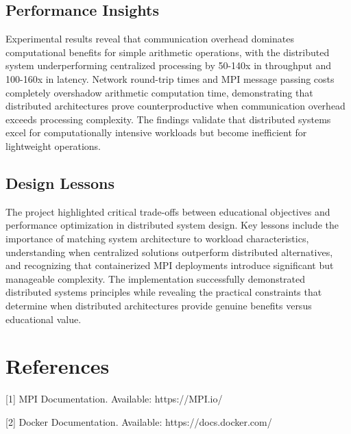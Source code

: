 \documentclass{article}
\begin{document}
\subsection{Performance Insights}
Experimental results reveal that communication overhead dominates computational benefits for simple arithmetic operations, with the distributed system underperforming centralized processing by 50-140x in throughput and 100-160x in latency. Network round-trip times and MPI message passing costs completely overshadow arithmetic computation time, demonstrating that distributed architectures prove counterproductive when communication overhead exceeds processing complexity. The findings validate that distributed systems excel for computationally intensive workloads but become inefficient for lightweight operations.

\subsection{Design Lessons}
The project highlighted critical trade-offs between educational objectives and performance optimization in distributed system design. Key lessons include the importance of matching system architecture to workload characteristics, understanding when centralized solutions outperform distributed alternatives, and recognizing that containerized MPI deployments introduce significant but manageable complexity. The implementation successfully demonstrated distributed systems principles while revealing the practical constraints that determine when distributed architectures provide genuine benefits versus educational value.



\newpage
\section{References}

[1] MPI Documentation. Available: https://MPI.io/

[2] Docker Documentation. Available: https://docs.docker.com/
\end{document}

